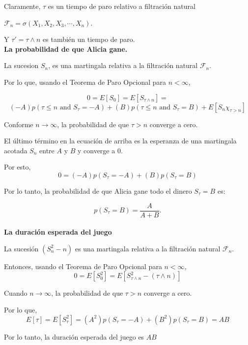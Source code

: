 Claramente, $\tau$ es un tiempo de paro relativo a filtración natural

$\mathcal{F}_n = \sigma(X_1,X_2,X_3,\cdots,X_n)$. 

Y $\tau' = \tau \wedge n$ es también un tiempo de paro.\\

\textbf{La probabilidad de que Alicia gane.}

La sucesion $S_n$, es una martingala relativa a la filtración natural $\mathcal{F}_n$.
 
Por lo que, usando el Teorema de Paro Opcional para $n < \infty$,

\[ 0 = {E}[S_0] = {E}[S_{\tau \wedge n}] =\]
\[ (-A) p(\tau \leq n \mbox{ and } S_{\tau} = -A) + (B) p(\tau \leq n \mbox{ and } S_{\tau} = B) + E[S_n \chi_{\tau > n}]\]
                                               
Conforme $n \to \infty$, la probabilidad de que $\tau > n$ converge a cero.

El último término en la ecuación de arriba es la esperanza de una martingala acotada $S_n$ entre $A$ y $B$ y converge a $0$.


Por esto, 
 \[
  0 = (- A) p(S_{\tau} = -A) + (B) p(S_{\tau} = B) 
 \]
 
 Por lo tanto, la probabilidad de que Alicia gane todo el dinero $S_{\tau} = B$ es:
 

 \[
 p(S_{\tau} = B) = \frac{A}{A+B}.
 \]\\

\textbf{La duración esperada del juego}

La sucesión $(S_n^2-n)$ es una martingala relativa a la filtración natural $\mathcal{F}_n$.

Entonces, usando el Teorema de Paro Opcional para $n < \infty$,
\[
 0 = {E}[S^2_0] = {E}[S_{\tau \wedge n}^2 - (\tau \wedge n)]
 \]
                                                                                                           
Cuando $n \to \infty$, la probabilidad de que $\tau > n$ converge a cero. 

Por lo que,
\[
E[\tau] = E[S_{\tau}^2] = (A^2)  p(S_{\tau} = -A) + (B^2)  p(S_{\tau} = B) = AB 
\]         
                      
Por lo tanto, la duración esperada del juego es $AB$



 